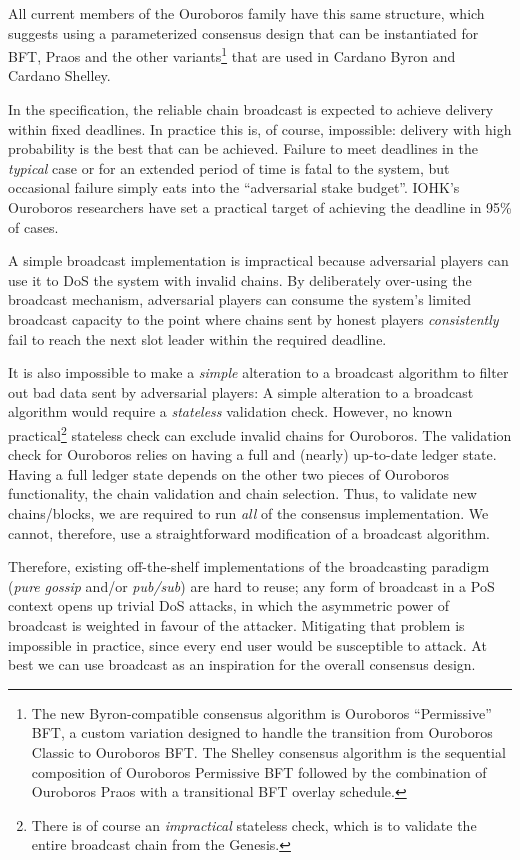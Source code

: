 \documentclass[]{article}
\begin{document}
All current members of the Ouroboros family have this same structure,
which suggests using a parameterized consensus design that can be
instantiated for BFT, Praos and the other variants\footnote{The new
  Byron-compatible consensus algorithm is Ouroboros ``Permissive'' BFT,
  a custom variation designed to handle the transition from Ouroboros
  Classic to Ouroboros BFT. The Shelley consensus algorithm is the
  sequential composition of Ouroboros Permissive BFT followed by the
  combination of Ouroboros Praos with a transitional BFT overlay
  schedule.} that are used in Cardano Byron and Cardano Shelley.

In the specification, the reliable chain broadcast is expected to
achieve delivery within fixed deadlines. In practice this is, of course,
impossible: delivery with high probability is the best that can be
achieved. Failure to meet deadlines in the \emph{typical} case or for an
extended period of time is fatal to the system, but occasional failure
simply eats into the ``adversarial stake budget''. IOHK's Ouroboros
researchers have set a practical target of achieving the deadline in
95\% of cases.

A simple broadcast implementation is impractical because adversarial
players can use it to DoS the system with invalid chains. By
deliberately over-using the broadcast mechanism, adversarial players can
consume the system's limited broadcast capacity to the point where
chains sent by honest players \emph{consistently} fail to reach the next
slot leader within the required deadline.

It is also impossible to make a \emph{simple} alteration to a broadcast
algorithm to filter out bad data sent by adversarial players: A simple
alteration to a broadcast algorithm would require a \emph{stateless}
validation check. However, no known practical\footnote{There is of
  course an \emph{impractical} stateless check, which is to validate the
  entire broadcast chain from the Genesis.} stateless check can exclude
invalid chains for Ouroboros. The validation check for Ouroboros relies
on having a full and (nearly) up-to-date ledger state. Having a full
ledger state depends on the other two pieces of Ouroboros functionality,
the chain validation and chain selection. Thus, to validate new
chains/blocks, we are required to run \emph{all} of the consensus
implementation. We cannot, therefore, use a straightforward modification
of a broadcast algorithm.

Therefore, existing off-the-shelf implementations of the broadcasting
paradigm (\emph{pure} \emph{gossip} and/or \emph{pub/sub}) are hard to
reuse; any form of broadcast in a PoS context
\protect\hypertarget{dpbtiakzv0oy}{}{}opens up trivial DoS attacks, in
which the asymmetric power of broadcast is weighted in favour of the
attacker. Mitigating that problem is impossible in practice, since every
end user would be susceptible to attack. At best we can use broadcast as
an inspiration for the overall consensus design.
\end{document}
